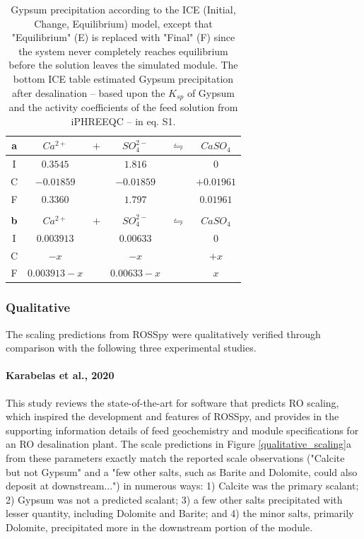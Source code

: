 \begin{table}
    \centering
    \begin{tabular}{c|ccccc}
      \toprule
      \textbf{a} & $Ca^{2+}$ & $+$ & $SO_4^{2-}$ & $\leftrightharpoons$ & $CaSO_4$ \\
      \midrule
      I & $0.3545$ && $1.816$ && $0$ \\
      C & $-0.01859$ && $-0.01859$ && $+0.01961$ \\
      F & $0.3360$ && $1.797$ && $0.01961$ \\
      \bottomrule
      \\
      \toprule
      \textbf{b} & $Ca^{2+}$ & $+$ & $SO_4^{2-}$ & $\leftrightharpoons$ & $CaSO_4$ \\
      \midrule
      I & $0.003913$ && $0.00633$ && $0$ \\
      C & $-x$ && $-x$ && $+x$ \\
      F & $0.003913-x$ && $0.00633-x$ && $x$ \\
      \bottomrule
    \end{tabular}
    \caption{
        Gypsum precipitation according to the ICE (Initial, Change, Equilibrium) model, except that "Equilibrium" (E) is replaced with "Final" (F) since the system never completely reaches equilibrium before the solution leaves the simulated module. The bottom ICE table estimated Gypsum precipitation after desalination -- based upon the $K_{sp}$ of Gypsum and the activity coefficients of the feed solution from iPHREEQC -- in eq. S1. 
      }
    \label{gypsum_ice_table}
\end{table}

\subsubsection{Qualitative}
The scaling predictions from ROSSpy were qualitatively verified through comparison with the following three experimental studies. 

\paragraph{Karabelas et al., 2020 \cite{Karabelas2020ScalingTools}}
This study reviews the state-of-the-art for software that predicts RO scaling, which inspired the development and features of ROSSpy, and provides in the supporting information details of feed geochemistry and module specifications for an RO desalination plant. The scale predictions in Figure \ref{qualitative_scaling}a from these parameters exactly match the reported scale observations ("Calcite but not Gypsum" and a "few other salts, such as Barite and Dolomite, could also deposit at downstream...") in numerous ways: 1) Calcite was the primary scalant; 2) Gypsum was not a predicted scalant; 3) a few other salts precipitated with lesser quantity, including Dolomite and Barite; and 4) the minor salts, primarily Dolomite, precipitated more in the downstream portion of the module.  

